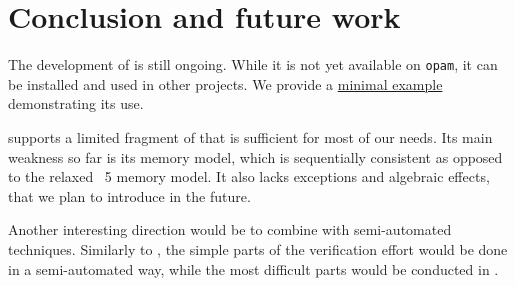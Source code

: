 \section{Conclusion and future work}

The development of \Zoo is still ongoing.
While it is not yet available on \texttt{opam}, it can be installed and used in other \Rocq projects.
We provide a \href{https://github.com/clef-men/zoo_demo}{minimal example} demonstrating its use.

\Zoo supports a limited fragment of \OCaml that is sufficient for most of our needs.
Its main weakness so far is its memory model, which is sequentially consistent as opposed to the relaxed \OCaml~5 memory model.
It also lacks exceptions and algebraic effects, that we plan to introduce in the future.

Another interesting direction would be to combine \Zoo with semi-automated techniques.
Similarly to \WhyThree, the simple parts of the verification effort would be done in a semi-automated way, while the most difficult parts would be conducted in \Rocq.

